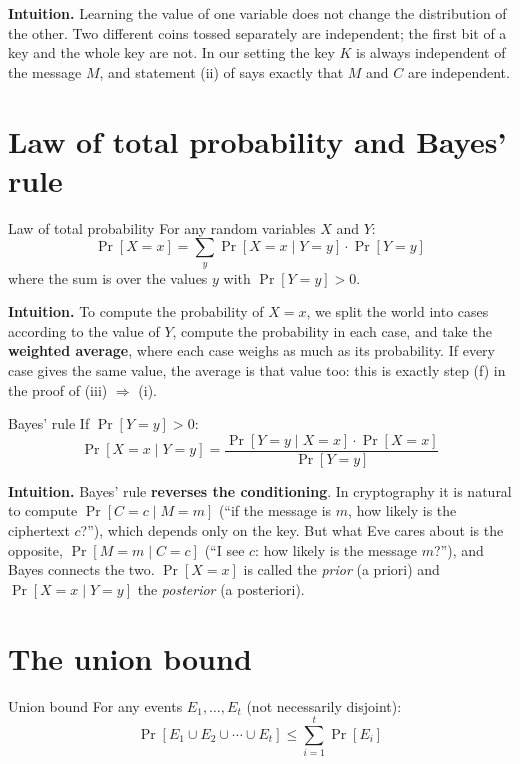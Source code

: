 \textbf{Intuition.} Learning the value of one variable does not change the distribution of the other. Two different coins tossed separately are independent; the first bit of a key and the whole key are not. In our setting the key $K$ is always independent of the message $M$, and statement (ii) of  says exactly that $M$ and $C$ are independent.

\section{Law of total probability and Bayes' rule}

\begin{framedthm}{Law of total probability}
  For any random variables $X$ and $Y$:
  \[
    \Pr[X = x] = \sum_{y} \Pr[X = x \mid Y = y] \cdot \Pr[Y = y]
  \]
  where the sum is over the values $y$ with $\Pr[Y = y] > 0$.
\end{framedthm}

\textbf{Intuition.} To compute the probability of $X = x$, we split the world into cases according to the value of $Y$, compute the probability in each case, and take the \textbf{weighted average}, where each case weighs as much as its probability. If every case gives the same value, the average is that value too: this is exactly step (f) in the proof of (iii) $\Rightarrow$ (i).

\begin{framedthm}{Bayes' rule}
  If $\Pr[Y = y] > 0$:
  \[
    \Pr[X = x \mid Y = y] = \frac{\Pr[Y = y \mid X = x] \cdot \Pr[X = x]}{\Pr[Y = y]}
  \]
\end{framedthm}

\textbf{Intuition.} Bayes' rule \textbf{reverses the conditioning}. In cryptography it is natural to compute $\Pr[C = c \mid M = m]$ (``if the message is $m$, how likely is the ciphertext $c$?''), which depends only on the key. But what Eve cares about is the opposite, $\Pr[M = m \mid C = c]$ (``I see $c$: how likely is the message $m$?''), and Bayes connects the two. $\Pr[X = x]$ is called the \textit{prior} (a priori) and $\Pr[X = x \mid Y = y]$ the \textit{posterior} (a posteriori).

\section{The union bound}

\begin{framedthm}{Union bound}
  For any events $E_1, \ldots, E_t$ (not necessarily disjoint):
  \[
    \Pr[E_1 \cup E_2 \cup \cdots \cup E_t] \leq \sum_{i=1}^{t} \Pr[E_i]
  \]
\end{framedthm}

